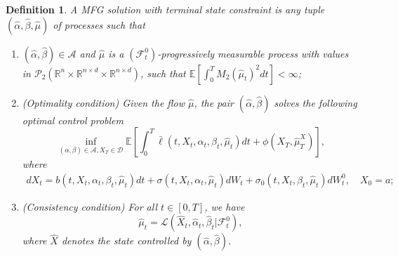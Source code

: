 \documentclass[11pt,a4paper]{article}
\newtheorem{defi}[theo]{Definition}
\begin{document}
\begin{defi} \label{def-MFG-constraint} A MFG solution with terminal state constraint is any tuple $(\hat \alpha, \hat\beta, \hat \mu)$ of processes such that
\begin{enumerate}
\item $(\hat\alpha, \hat\beta) \in \mathcal A$ and  $\hat \mu$ is a $(\mathcal F_t ^0)$-progressively measurable process with values in $\mathcal{P}_2(\mathbb R^n \times \mathbb R^{n\times d} \times \mathbb R^{n\times d})$, such that $\mathbb E \left[\int_0^T M_2(\hat \mu_t)^2 dt\right]<\infty$;
\item (Optimality condition) Given the flow $\hat \mu$, the pair $(\hat \alpha, \hat \beta)$ solves the following optimal control problem
\begin{equation}
\label{forward CN}
     \inf_{(\alpha, \beta)\in \mathcal A,  X_T \in \mathcal D} \mathbb{E}\left[\int _0^T \bar{\ell}(t,X_t,  \alpha_t, \beta_t, \hat\mu _t)dt+\phi(X_T,\hat\mu^X_T)\right],
\end{equation}
where
\begin{equation}
\begin{aligned}
    dX_t=b(t,X_t,  \alpha_t, \beta_t, \hat\mu_t)dt+\sigma(t,X_t, \alpha_t, \hat\mu_t)dW_t
    +\sigma_0(t,X_t, \beta_t, \hat\mu_t)dW_t^0, \quad  X_0=a;
 \end{aligned}   
\end{equation}
\item (Consistency condition)  For all $t\in [0,T]$, we have \[\hat\mu_t=\mathcal{L}(\hat X_t, \hat\alpha_t, \hat\beta_t|\mathcal{F}_t^0),\] where $\hat X$ denotes the state controlled by $(\hat\alpha, \hat\beta)$.    \end{enumerate}
\end{defi}
\end{document}
